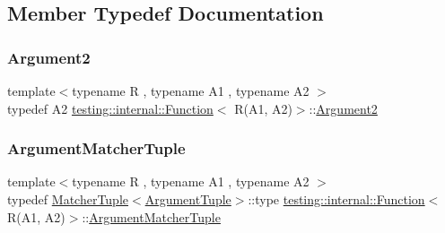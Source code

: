 \subsection{Member Typedef Documentation}
\mbox{\label{structtesting_1_1internal_1_1_function_3_01_r_07_a1_00_01_a2_08_4_a025f5192252366d73aa19718bb0ea89d}} 
\subsubsection{\texorpdfstring{Argument2}{Argument2}}
{\footnotesize\ttfamily template$<$typename R , typename A1 , typename A2 $>$ \\
typedef A2 \hyperlink{structtesting_1_1internal_1_1_function}{testing\+::internal\+::\+Function}$<$ R(A1, A2)$>$\+::\hyperlink{structtesting_1_1internal_1_1_function_3_01_r_07_a1_00_01_a2_08_4_a025f5192252366d73aa19718bb0ea89d}{Argument2}}

\mbox{\label{structtesting_1_1internal_1_1_function_3_01_r_07_a1_00_01_a2_08_4_ad07042129ff6370f55a279ad12f5e80f}} 
\subsubsection{\texorpdfstring{Argument\+Matcher\+Tuple}{ArgumentMatcherTuple}}
{\footnotesize\ttfamily template$<$typename R , typename A1 , typename A2 $>$ \\
typedef \hyperlink{structtesting_1_1internal_1_1_matcher_tuple}{Matcher\+Tuple}$<$\hyperlink{structtesting_1_1internal_1_1_function_3_01_r_07_08_4_ad483c3128c470d8cdb55c3ac1c575c11}{Argument\+Tuple}$>$\+::type \hyperlink{structtesting_1_1internal_1_1_function}{testing\+::internal\+::\+Function}$<$ R(A1, A2)$>$\+::\hyperlink{structtesting_1_1internal_1_1_function_3_01_r_07_08_4_a9bec5cf8937e8af99dedab2f40129fab}{Argument\+Matcher\+Tuple}}

